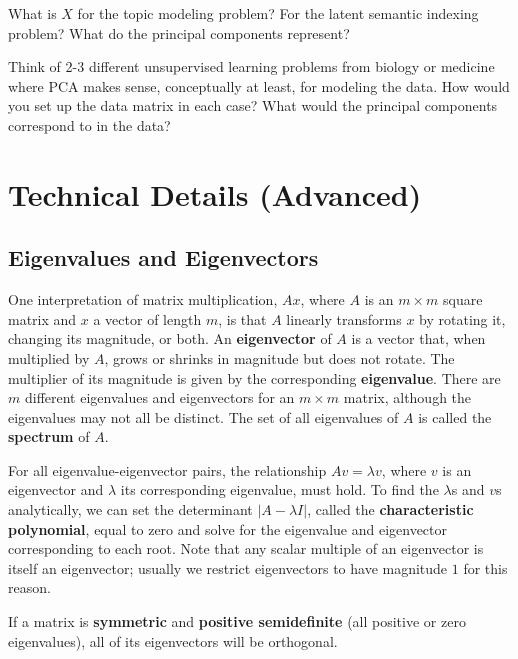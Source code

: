 \begin{question}{}
What is $X$ for the topic modeling problem? For the latent semantic indexing problem? What do the principal components represent?
\end{question}

\begin{question}{}
Think of 2-3 different unsupervised learning problems from biology or medicine where PCA makes sense, conceptually at least, for modeling the data. How would you set up the data matrix in each case? What would the principal components correspond to in the data? 
\end{question}


\section{Technical Details (Advanced)}

\subsection{Eigenvalues and Eigenvectors \label{ssect:eig}}

One interpretation of matrix multiplication, $Ax$, where $A$ is an $m \times m$ square matrix and $x$ a vector of length $m$, is that $A$ linearly transforms $x$ by rotating it, changing its magnitude, or both. An \textbf{eigenvector} of $A$ is a vector that, when multiplied by $A$, grows or shrinks in magnitude but does not rotate. The multiplier of its magnitude is given by the corresponding \textbf{eigenvalue}. There are $m$ different eigenvalues and eigenvectors for an $m \times m$ matrix, although the eigenvalues may not all be distinct. The set of all eigenvalues of $A$ is called the \textbf{spectrum} of $A$. 

For all eigenvalue-eigenvector pairs, the relationship $Av = \lambda v$, where $v$ is an eigenvector and $\lambda$ its corresponding eigenvalue, must hold. To find the $\lambda$s and $v$s analytically, we can set the determinant $ | A - \lambda I | $, called the \textbf{characteristic polynomial}, equal to zero and solve for the eigenvalue and eigenvector corresponding to each root. Note that any scalar multiple of an eigenvector is itself an eigenvector; usually we restrict eigenvectors to have magnitude $1$ for this reason.

If a matrix is \textbf{symmetric} and \textbf{positive semidefinite} (all positive or zero eigenvalues), all of its eigenvectors will be orthogonal.

